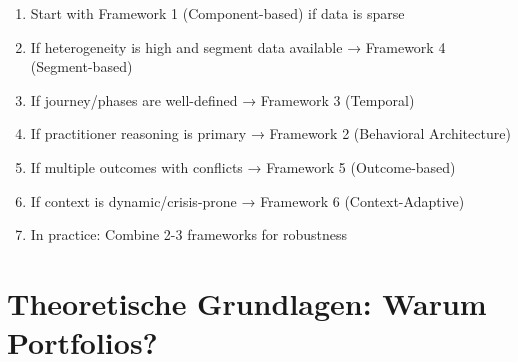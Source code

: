 \begin{enumerate}
\item Start with Framework 1 (Component-based) if data is sparse
\item If heterogeneity is high and segment data available → Framework 4 (Segment-based)
\item If journey/phases are well-defined → Framework 3 (Temporal)
\item If practitioner reasoning is primary → Framework 2 (Behavioral Architecture)
\item If multiple outcomes with conflicts → Framework 5 (Outcome-based)
\item If context is dynamic/crisis-prone → Framework 6 (Context-Adaptive)
\item In practice: Combine 2-3 frameworks for robustness
\end{enumerate}

\section{Theoretische Grundlagen: Warum Portfolios?}
\label{sec:20-theory}


